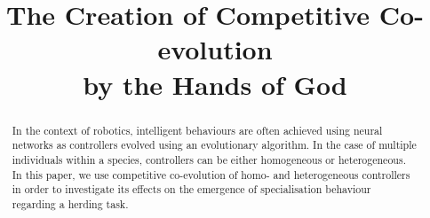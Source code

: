 \documentclass[conference]{IEEEtran}
\begin{document}
\title{The Creation of Competitive Co-evolution \\ by the Hands of God}



\author{
}



\maketitle


\begin{abstract}
In the context of robotics, intelligent behaviours are often achieved using neural networks as controllers evolved using  an evolutionary algorithm.
In the case of multiple individuals within a species, controllers can be either homogeneous or heterogeneous.
In this paper, we use competitive co-evolution of homo- and heterogeneous controllers in order to investigate its effects on the emergence of specialisation behaviour regarding a herding task.
\end{abstract}


\IEEEpeerreviewmaketitle
\end{document}
